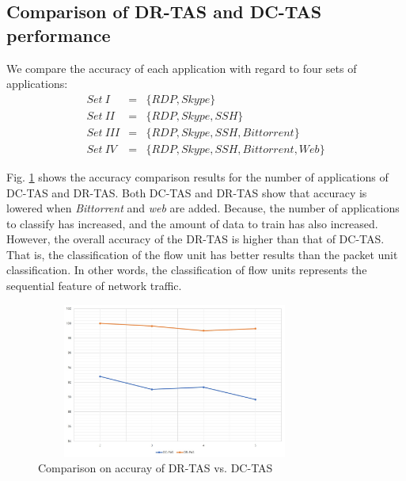 \documentclass[10pt, twoside, jounal]{IEEEtran}
\begin{document}
\subsection{Comparison of DR-TAS and DC-TAS performance}
We compare the accuracy of each application with regard to four sets of applications:
\begin{eqnarray}
    Set~I&=&\{RDP, Skype\} \\
    Set~II&=&\{RDP, Skype, SSH\} \\
    Set~III&=&\{RDP, Skype, SSH, Bittorrent\} \\
    Set~IV&=&\{RDP, Skype, SSH, Bittorrent, Web\}
\end{eqnarray}

Fig. \ref{fig7} shows the accuracy comparison results for the number of applications of DC-TAS and DR-TAS.
Both DC-TAS and DR-TAS show that accuracy is lowered when {\it Bittorrent} and {\it web} are added.
Because, the number of applications to classify has increased, and the amount of data to train has also increased.
However, the overall accuracy of the DR-TAS is higher than that of DC-TAS.
That is, the classification of the flow unit has better results than the packet unit classification.
In other words, the classification of flow units represents the sequential feature of network traffic.

\begin{figure}[!t]
\centering
\setlength{\abovecaptionskip}{0pt}
\setlength{\belowcaptionskip}{0pt}
{
\includegraphics[width=3.6in, height=2.0in]{fig7.jpg}
\caption{Comparison on accuray of DR-TAS vs. DC-TAS }
\label{fig7}
}
\end{figure}
\end{document}
